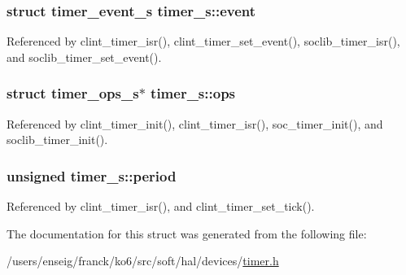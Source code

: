 \hypertarget{structtimer__s_ad65ea18f2fc79735a86d6ba118933f5b}{
\subsubsection[{event}]{\setlength{\rightskip}{0pt plus 5cm}struct {\bf timer\-\_\-event\-\_\-s} timer\-\_\-s\-::event}}\label{structtimer__s_ad65ea18f2fc79735a86d6ba118933f5b}


Referenced by clint\-\_\-timer\-\_\-isr(), clint\-\_\-timer\-\_\-set\-\_\-event(), soclib\-\_\-timer\-\_\-isr(), and soclib\-\_\-timer\-\_\-set\-\_\-event().

\hypertarget{structtimer__s_a859db5220e0605eabaa9100121940b5e}{
\subsubsection[{ops}]{\setlength{\rightskip}{0pt plus 5cm}struct {\bf timer\-\_\-ops\-\_\-s}$\ast$ timer\-\_\-s\-::ops}}\label{structtimer__s_a859db5220e0605eabaa9100121940b5e}


Referenced by clint\-\_\-timer\-\_\-init(), clint\-\_\-timer\-\_\-isr(), soc\-\_\-timer\-\_\-init(), and soclib\-\_\-timer\-\_\-init().

\hypertarget{structtimer__s_a9174e40ce5a0ea4f7072968f377d27b5}{
\subsubsection[{period}]{\setlength{\rightskip}{0pt plus 5cm}unsigned timer\-\_\-s\-::period}}\label{structtimer__s_a9174e40ce5a0ea4f7072968f377d27b5}


Referenced by clint\-\_\-timer\-\_\-isr(), and clint\-\_\-timer\-\_\-set\-\_\-tick().



The documentation for this struct was generated from the following file\-:\begin{DoxyCompactItemize}
\item 
/users/enseig/franck/ko6/src/soft/hal/devices/\hyperlink{timer_8h}{timer.\-h}\end{DoxyCompactItemize}
